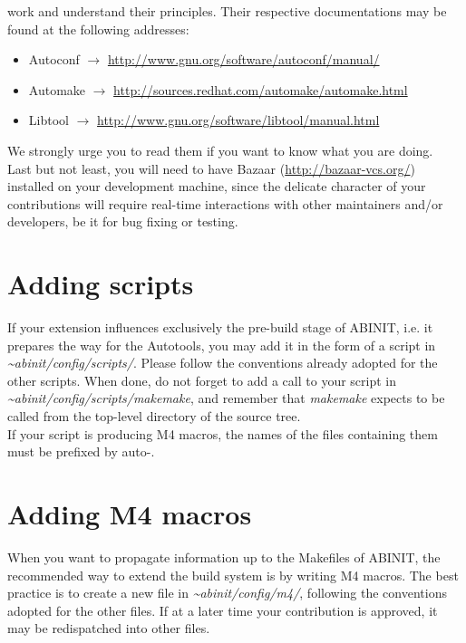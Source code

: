 work and understand their principles. Their respective documentations
may be found at the following addresses:
\begin{itemize}
\item Autoconf $\longrightarrow$ \href{http://www.gnu.org/software/autoconf/manual/}{http://www.gnu.org/software/autoconf/manual/}
\item Automake $\longrightarrow$ \href{http://sources.redhat.com/automake/automake.html}{http://sources.redhat.com/automake/automake.html}
\item Libtool $\longrightarrow$ \href{http://www.gnu.org/software/libtool/manual.html}{http://www.gnu.org/software/libtool/manual.html}
\end{itemize}
We strongly urge you to read them if you want to know what you are
doing.\\


Last but not least, you will need to have Bazaar (\href{http://bazaar-vcs.org/}{http://bazaar-vcs.org/})
installed on your development machine, since the delicate character
of your contributions will require real-time interactions with other
maintainers and/or developers, be it for bug fixing or testing.


\section{Adding scripts}

If your extension influences exclusively the pre-build stage of ABINIT,
i.e. it prepares the way for the Autotools, you may add it in the
form of a script in \textit{\textasciitilde{}abinit/config/scripts/}.
Please follow the conventions already adopted for the other scripts.
When done, do not forget to add a call to your script in \textit{\textasciitilde{}abinit/config/scripts/makemake},
and remember that \textit{makemake} expects to be called from the
top-level directory of the source tree.\\


If your script is producing M4 macros, the names of the files containing
them must be prefixed by \textquotedbl{}auto-\textquotedbl{}.


\section{Adding M4 macros}

When you want to propagate information up to the Makefiles of ABINIT,
the recommended way to extend the build system is by writing M4 macros.
The best practice is to create a new file in \textit{\textasciitilde{}abinit/config/m4/},
following the conventions adopted for the other files. If at a later
time your contribution is approved, it may be redispatched into other
files.


